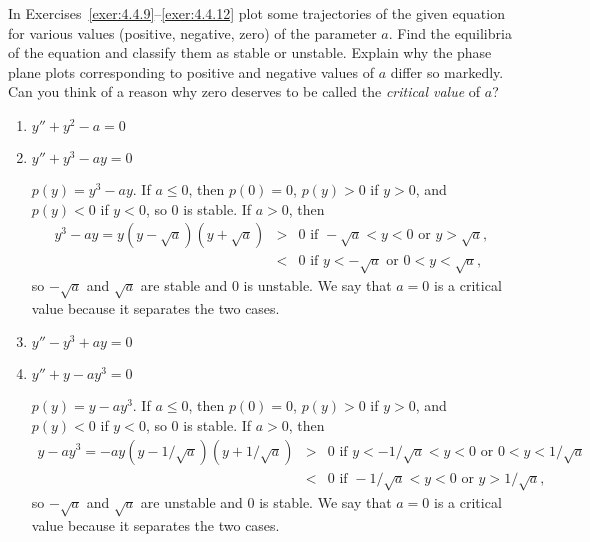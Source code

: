 \documentclass{ximera}
\begin{document}
\begin{problem}
In Exercises~\ref{exer:4.4.9}--\ref{exer:4.4.12}
plot some trajectories of the given equation for various values
(positive, negative, zero) of the parameter $a$. Find the equilibria
of the equation and classify them as stable or unstable. Explain why
the phase plane plots corresponding to positive and negative values of
$a$ differ so markedly. Can you think of a reason why zero deserves to
be called the \emph{critical value} of $a$?

\begin{enumerate}
\item\label{exer:4.4.9} $y''+y^2-a=0$

\item\label{exer:4.4.10} $y''+y^3-ay=0$

\begin{solution}
$p(y)=y^3-ay$.
If $a\le0$, then $p(0)=0$, $p(y)>0$ if $y>0$, and $p(y)<0$ if $y<0$, so
$0$ is stable.
 If $a>0$, then
\begin{eqnarray*}
y^3-ay=y(y-\sqrt a)(y+\sqrt a)&>&0\mbox{ if }-\sqrt a<y<0\mbox{ or }
y>\sqrt a,\\
&<&0\mbox{ if }y<-\sqrt a\mbox{ or }0<y<\sqrt a,
\end{eqnarray*}
so $-\sqrt a$ and $\sqrt a$ are  stable  and $0$
is unstable. We say that $a=0$ is a critical value
because it separates the two cases.
\end{solution}

\item\label{exer:4.4.11} $y''-y^3+ay=0$

\item\label{exer:4.4.12} $y''+y-ay^3=0$
\begin{solution}
$p(y)=y-ay^3$. If $a\le0$, then $p(0)=0$, $p(y)>0$ if $y>0$, and
$p(y)<0$ if $y<0$, so $0$ is stable. If $a>0$, then
\begin{eqnarray*}
y-ay^3=-ay(y-1/\sqrt a)(y+1/\sqrt a)&>&0\mbox{ if }y<-1/\sqrt
a<y<0\mbox{ or } 0<y<1/\sqrt a\\
&<&0\mbox{ if }-1/\sqrt a<y<0\mbox{ or }y>1/\sqrt a,
\end{eqnarray*}
so $-\sqrt a$ and $\sqrt a$ are unstable and $0$ is stable. We say
that $a=0$ is a critical value because it separates the two cases.
\end{solution}
\end{enumerate}
\end{problem}
\end{document}
